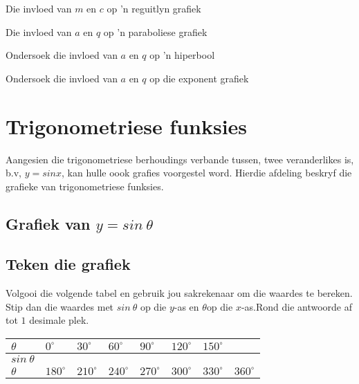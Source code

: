 \begin{Ondersoek}{Die invloed van $m$ en $c$ op 'n reguitlyn grafiek}
\begin{Ondersoek}{Die invloed van $a$ en $q$ op 'n paraboliese grafiek}
\begin{Ondersoek}{Ondersoek die invloed van $a$ en $q$ op 'n hiperbool}
\begin{Ondersoek}{Ondersoek die invloed van $a$ en $q$ op die exponent grafiek}
\section{Trigonometriese funksies}
\nopagebreak
Aangesien die trigonometriese berhoudings verbande tussen, twee veranderlikes is, b.v, $y=sinx$, kan hulle oook grafies voorgestel word.
Hierdie afdeling beskryf die grafieke van trigonometriese funksies.\par 


\subsection{Grafiek van $y=sin~\theta $}
\subsection*{Teken die grafiek}
\nopagebreak
Volgooi die volgende tabel en gebruik jou sakrekenaar om die waardes te bereken. Stip dan die waardes met $sin~\theta $ op die $y$-as en $\theta $op die $x$-as.Rond die antwoorde af tot $1$ desimale plek.\par 

\setlength\mytablespace{16\tabcolsep}
\addtolength\mytablespace{9\arrayrulewidth}
\setlength\mytablewidth{\linewidth}
\setlength\mytableroom{\mytablewidth}
\addtolength\mytableroom{-\mytablespace}
\setlength\myfixedwidth{0pt}
\setlength\mystarwidth{\mytableroom}
\addtolength\mystarwidth{-\myfixedwidth}
\divide{}
\begin{center}
\label{m39414*id83562}
\noindent

\begin{tabular*}{\mytablewidth}{|p{10\mystarwidth}|p{10\mystarwidth}|p{10\mystarwidth}|p{10\mystarwidth}|p{10\mystarwidth}|p{10\mystarwidth}|p{10\mystarwidth}|p{10\mystarwidth}|}\hline

$\theta $  &
$0^{\circ }$ &
$30^{\circ }$ &
$60^{\circ }$ &
$90^{\circ }$ &
$120^{\circ }$ &
$150^{\circ }$ &
\\ \hline

$sin~\theta $ 
&
&
&
&
&
&
&
\\ \hline

$\theta $&
$180^{\circ }$ &
$210^{\circ }$ &
$240^{\circ }$ &
$270^{\circ }$ &
$300^{\circ }$ &
$330^{\circ }$ &
$360^{\circ }$%
\\ \hline


\end{tabular*}
\end{center}
\end{Ondersoek}
\end{Ondersoek}
\end{Ondersoek}
\end{Ondersoek}
